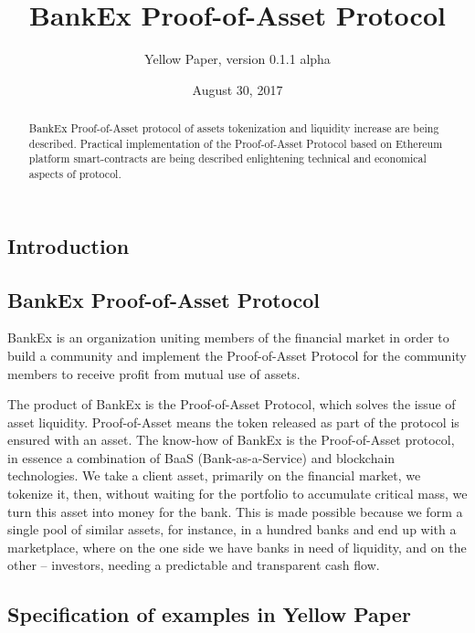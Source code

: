 \documentclass{article}
\title{BankEx Proof-of-Asset Protocol}
\author{Yellow Paper, version 0.1.1 alpha}
\date{August 30, 2017}
\begin{document}

\maketitle

\begin{abstract}
BankEx Proof-of-Asset protocol of assets tokenization and liquidity increase are being described. Practical implementation of the Proof-of-Asset Protocol based on Ethereum platform smart-contracts are being described enlightening technical and economical aspects of protocol.
\end{abstract}

\vspace{24pt}

\begin{multicols}{2}

\section{Introduction}

\subsection{BankEx Proof-of-Asset Protocol}

BankEx is an organization uniting members of the financial market in order to build a community and implement the Proof-of-Asset Protocol for the community members to receive profit from mutual use of assets. 

The product of BankEx is the Proof-of-Asset Protocol, which solves the issue of asset liquidity. Proof-of-Asset means the token released as part of the protocol is ensured with an asset. 
The know-how of BankEx is the Proof-of-Asset protocol, in essence a combination of BaaS (Bank-as-a-Service) and blockchain technologies. We take a client asset, primarily on the financial market, we tokenize it, then, without waiting for the portfolio to accumulate critical mass, we turn this asset into money for the bank.  This is made possible because we form a single pool of similar assets, for instance, in a hundred banks and end up with a marketplace, where on the one side we have banks in need of liquidity, and on the other – investors, needing a predictable and transparent cash flow.

\subsection{Specification of examples in Yellow Paper}


\end{multicols}
\end{document}
